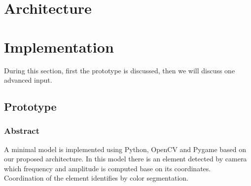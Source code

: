 \documentclass{report}
\begin{document}
\section{Architecture}



\pagebreak
\section{Implementation}
During this section, first the prototype is discussed, then we will discuss one advanced input. 



\subsection{Prototype}

\subsubsection{Abstract}{A minimal model is implemented using Python, OpenCV and Pygame based on our proposed architecture. In this model there is an element detected by camera which frequency and amplitude is computed base on its coordinates. Coordination of the element identifies by color segmentation.}

\end{document}
